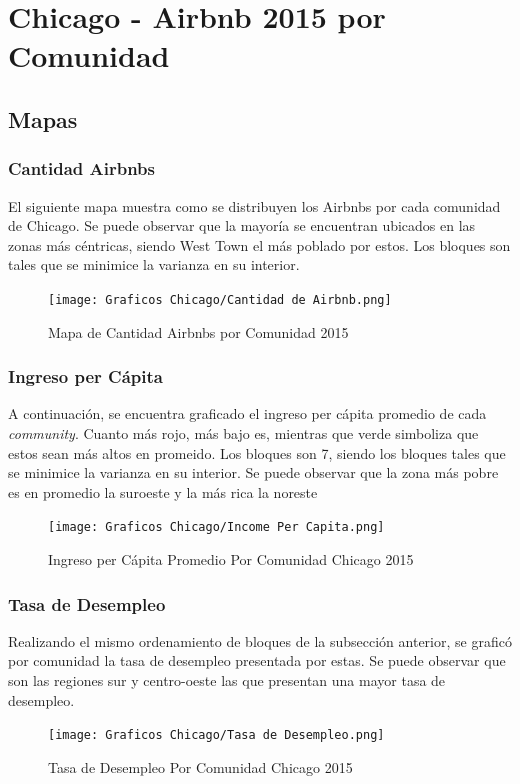 \documentclass[9pt]{article}
\begin{document}
\section{Chicago - Airbnb 2015 por Comunidad}
\subsection{Mapas}
\subsubsection{Cantidad Airbnbs}
El siguiente mapa muestra como se distribuyen los Airbnbs por cada comunidad de Chicago. Se puede observar que la mayor\'ia se encuentran ubicados en las zonas m\'as c\'entricas, siendo West Town el m\'as poblado por estos. Los bloques son tales que se minimice la varianza en su interior.
\begin{figure}[H]
    \centering
\caption{Mapa de Cantidad Airbnbs por Comunidad 2015}
    \texttt{[image: Graficos Chicago/Cantidad de Airbnb.png]}
\end{figure}
\subsubsection{Ingreso per C\'apita}
A continuaci\'on, se encuentra graficado el ingreso per c\'apita promedio de cada \textit{community}. Cuanto m\'as rojo, m\'as bajo es, mientras que verde simboliza que estos sean m\'as altos en promeido. Los bloques son 7, siendo los bloques tales que se minimice la varianza en su interior. Se puede observar que la zona m\'as pobre es en promedio la suroeste y la m\'as rica la noreste 
\begin{figure}[H]
    \centering
\caption{Ingreso per C\'apita Promedio Por Comunidad Chicago 2015}
    \texttt{[image: Graficos Chicago/Income Per Capita.png]}
\end{figure}
\subsubsection{Tasa de Desempleo}
Realizando el mismo ordenamiento de bloques de la subsecci\'on anterior, se grafic\'o por comunidad la tasa de desempleo presentada por estas. Se puede observar que son las regiones sur y centro-oeste las que presentan una mayor tasa de desempleo.
\begin{figure}[H]
    \centering
\caption{Tasa de Desempleo Por Comunidad Chicago 2015}
    \texttt{[image: Graficos Chicago/Tasa de Desempleo.png]}
\end{figure}
\end{document}

